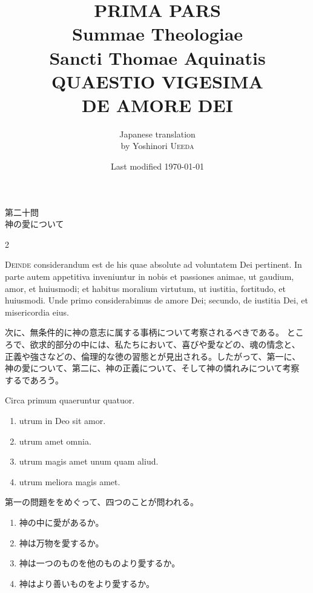 \documentclass[paper=a4paper,fontsize=10pt,jafontsize=9pt,titlepage]{jlreq}
\title{{\bfseries PRIMA PARS}\\{\Huge Summae Theologiae}\\Sancti Thomae
Aquinatis\\{\sffamily QUAESTIO VIGESIMA}\\DE AMORE DEI}
\author{Japanese translation\\by Yoshinori {\scshape Ueeda}}
\date{Last modified \today}
\begin{document}
\maketitle
\pagestyle{fancy}

\begin{center}
{\Large 第二十問\\神の愛について}
\end{center}


\begin{paracol}{2}

{\Huge D}{\scshape einde} considerandum est de his quae absolute ad voluntatem Dei
 pertinent. In parte autem appetitiva inveniuntur in nobis et passiones
 animae, ut gaudium, amor, et huiusmodi; et habitus moralium virtutum,
 ut iustitia, fortitudo, et huiusmodi. Unde primo considerabimus de
 amore Dei; secundo, de iustitia Dei, et misericordia eius.

\switchcolumn

次に、無条件的に神の意志に属する事柄について考察されるべきである。
ところで、欲求的部分の中には、私たちにおいて、喜びや愛などの、魂の情念と、
 正義や強さなどの、倫理的な徳の習態とが見出される。したがって、第一に、
 神の愛について、第二に、神の正義について、そして神の憐れみについて考察
 するであろう。

\switchcolumn


Circa primum
 quaeruntur quatuor. 

\begin{enumerate}
 \item utrum in Deo sit amor.
 \item utrum amet omnia.
 \item utrum magis amet unum quam aliud.
 \item utrum meliora magis amet.
\end{enumerate}

\switchcolumn

第一の問題ををめぐって、四つのことが問われる。
\begin{enumerate}
 \item 神の中に愛があるか。
 \item 神は万物を愛するか。
 \item 神は一つのものを他のものより愛するか。
 \item 神はより善いものをより愛するか。
\end{enumerate}

\end{paracol}

\newpage
\end{document}
